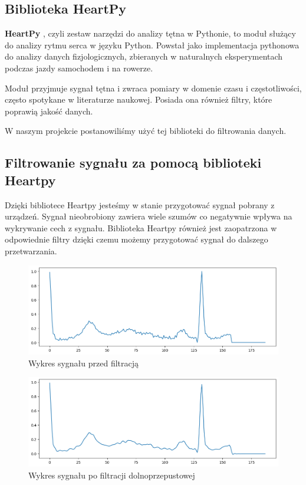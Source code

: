 \documentclass[12pt,a4paper]{article}
\begin{document}
\subsection{Biblioteka HeartPy} \label{sec:heartpy}
\textbf{HeartPy} \cite{heartpy-1,heartpy-2}, czyli zestaw narzędzi do analizy tętna w Pythonie, to moduł służący do analizy rytmu serca w języku Python. Powstał jako implementacja pythonowa do analizy danych fizjologicznych, zbieranych w naturalnych eksperymentach podczas jazdy samochodem i na rowerze.

Moduł przyjmuje sygnał tętna i zwraca pomiary w domenie czasu i częstotliwości, często spotykane w literaturze naukowej. Posiada ona również filtry, które poprawią jakość danych.

W naszym projekcie postanowiliśmy użyć tej biblioteki do filtrowania danych.

\subsection{Filtrowanie sygnału za pomocą biblioteki Heartpy} \label{sec:filtrowanie}
Dzięki bibliotece Heartpy jesteśmy w stanie przygotować sygnał pobrany z urządzeń. Sygnał nieobrobiony zawiera wiele szumów co negatywnie wpływa na wykrywanie cech z sygnału. Biblioteka Heartpy również jest zaopatrzona w odpowiednie filtry dzięki czemu możemy przygotować sygnał do dalszego przetwarzania.

\begin{figure}[H]
    \centering
    \includegraphics[width=1\linewidth]{heartpy-nofilter.png}
    \caption{Wykres sygnału przed filtracją}
\end{figure}

\begin{figure}[H]
    \centering
    \includegraphics[width=1\linewidth]{images/heartpy-filter.png}
    \caption{Wykres sygnału po filtracji dolnoprzepustowej}
\end{figure}
\end{document}
